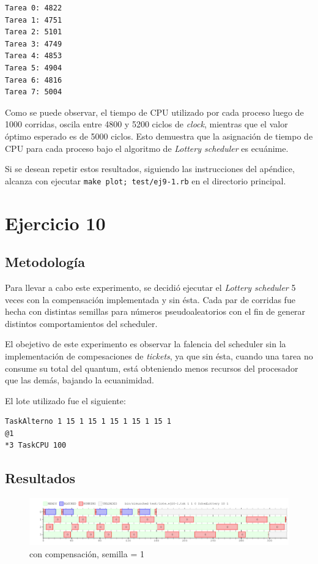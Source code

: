 \documentclass[a4paper]{article}
\begin{document}
\begin{verbatim}
Tarea 0: 4822
Tarea 1: 4751
Tarea 2: 5101
Tarea 3: 4749
Tarea 4: 4853
Tarea 5: 4904
Tarea 6: 4816
Tarea 7: 5004
\end{verbatim}

Como se puede observar, el tiempo de CPU utilizado por cada proceso luego de
1000 corridas, oscila entre 4800 y 5200 ciclos de \textit{clock}, mientras
que el valor óptimo esperado es de 5000 ciclos. Esto demuestra que la
asignación de tiempo de CPU para cada proceso bajo el algoritmo de
\textit{Lottery scheduler} es ecuánime.

Si se desean repetir estos resultados, siguiendo las instrucciones del
apéndice, alcanza con ejecutar \verb|make plot; test/ej9-1.rb| en el
directorio principal.

\section{Ejercicio 10}

\subsection{Metodología}
Para llevar a cabo este experimento, se decidió ejecutar el \textit{Lottery
scheduler} 5 veces con la compensación implementada y sin ésta. Cada par de
corridas fue hecha con distintas semillas para números pseudoaleatorios con
el fin de generar distintos comportamientos del scheduler.

El obejetivo de este experimento es observar la falencia del scheduler sin
la implementación de compesaciones de \textit{tickets}, ya que sin ésta,
cuando una tarea no consume su total del quantum, está obteniendo menos
recursos del procesador que las demás, bajando la ecuanimidad.

El lote utilizado fue el siguiente:
\begin{verbatim}
TaskAlterno 1 15 1 15 1 15 1 15 1 15 1
@1
*3 TaskCPU 100
\end{verbatim}

\subsection{Resultados}

\begin{figure}[H]
\begin{center}
\includegraphics[scale=0.4]{imagenes/ej10-1-c-s-1.png}
\end{center}
\caption{con compensación, semilla = 1}
\end{figure}
\end{document}
